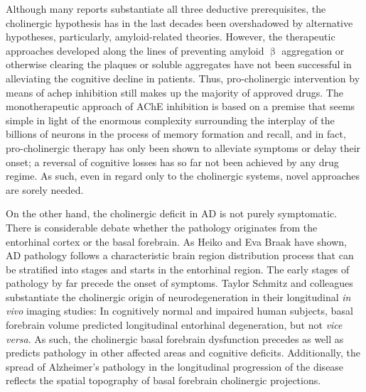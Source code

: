 Although many reports substantiate all three deductive prerequisites, the cholinergic hypothesis has in the last decades been overshadowed by alternative hypotheses, particularly, amyloid-related theories. However, the therapeutic approaches developed along the lines of preventing amyloid $\upbeta$ aggregation or otherwise clearing the plaques or soluble aggregates have not been successful in alleviating the cognitive decline in patients.\cite{} Thus, pro-cholinergic intervention by means of \ac{achep} inhibition still makes up the majority of approved drugs. The monotherapeutic approach of AChE inhibition is based on a premise that seems simple in light of the enormous complexity surrounding the interplay of the billions of neurons in the process of memory formation and recall, and in fact, pro-cholinergic therapy has only been shown to alleviate symptoms or delay their onset; a reversal of cognitive losses has so far not been achieved by any drug regime. As such, even in regard only to the cholinergic systems, novel approaches are sorely needed.

On the other hand, the cholinergic deficit in AD is not purely symptomatic. There is considerable debate whether the pathology originates from the entorhinal cortex or the basal forebrain. As Heiko and Eva Braak have shown,\cite{Braak1995} AD pathology follows a characteristic brain region distribution process that can be stratified into stages and starts in the entorhinal region. The early stages of pathology by far precede the onset of symptoms. Taylor Schmitz and colleagues substantiate the cholinergic origin of neurodegeneration in their longitudinal \emph{in vivo} imaging studies:\cite{Schmitz2016, Schmitz2018} In cognitively normal and impaired human subjects, basal forebrain volume predicted longitudinal entorhinal degeneration, but not \emph{vice versa}. As such, the cholinergic basal forebrain dysfunction precedes as well as predicts pathology in other affected areas and cognitive deficits.\cite{Schmitz2016} Additionally, the spread of Alzheimer's pathology in the longitudinal progression of the disease reflects the spatial topography of basal forebrain cholinergic projections.\cite{Schmitz2018}



